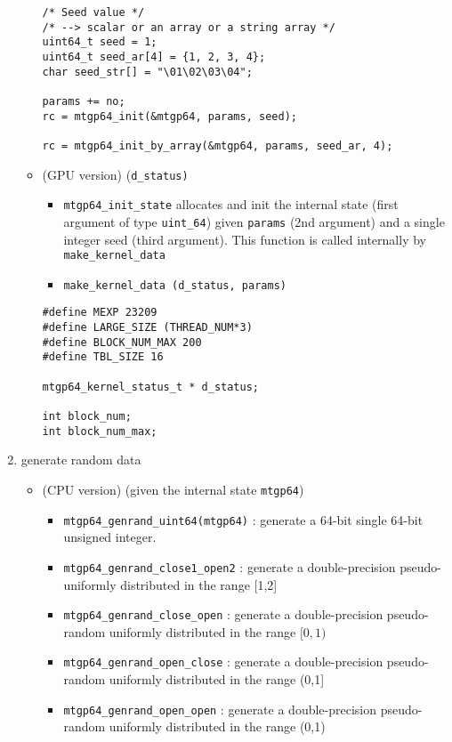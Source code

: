 \begin{enumerate}
\begin{itemize}
\begin{lstlisting}
/* Seed value */
/* --> scalar or an array or a string array */
uint64_t seed = 1;
uint64_t seed_ar[4] = {1, 2, 3, 4};
char seed_str[] = "\01\02\03\04";

params += no;
rc = mtgp64_init(&mtgp64, params, seed);

rc = mtgp64_init_by_array(&mtgp64, params, seed_ar, 4);
\end{lstlisting}

\item (GPU version)  (\verb!d_status)!
  \begin{itemize}
  \item  \verb!mtgp64_init_state! allocates and init the
    internal state (first argument of type \verb!uint_64!) given
    \verb!params! (2nd argument) and a single integer seed (third
    argument). This function is called internally by
    \verb!make_kernel_data!
  \item \verb!make_kernel_data (d_status, params)!
  \end{itemize}
\begin{lstlisting}
#define MEXP 23209
#define LARGE_SIZE (THREAD_NUM*3)
#define BLOCK_NUM_MAX 200
#define TBL_SIZE 16

mtgp64_kernel_status_t * d_status;

int block_num;
int block_num_max;

\end{lstlisting}
\end{itemize}


\item  generate random data
  \begin{itemize}
  \item (CPU version) (given the internal state \verb!mtgp64!)
  \begin{itemize}
  \item \verb!mtgp64_genrand_uint64(mtgp64)! : generate a 64-bit
    single 64-bit unsigned integer.
  \item \verb!mtgp64_genrand_close1_open2! : generate a
    double-precision pseudo-uniformly distributed in the range [1,2]
  \item \verb!mtgp64_genrand_close_open! : generate a double-precision
    pseudo-random uniformly distributed in the range $[0,1)$
  \item \verb!mtgp64_genrand_open_close! : generate a double-precision
    pseudo-random uniformly distributed in the range (0,1]
  \item \verb!mtgp64_genrand_open_open! : generate a double-precision
    pseudo-random uniformly distributed in the range (0,1)
  \end{itemize}


\end{itemize}
\end{enumerate}
